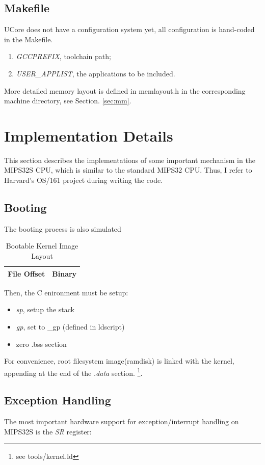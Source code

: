 \documentclass[a4paper]{article}
\begin{document}
\subsection{Makefile}
UCore does not have a configuration system yet, all configuration
is hand-coded in the Makefile.
\begin{enumerate}
\item \emph{GCCPREFIX}, toolchain path;
\item \emph{USER\_APPLIST}, the applications to be included.
\end{enumerate}

More detailed memory layout is defined in memlayout.h in the corresponding
machine directory, see Section. \ref{sec:mm}.

\section{Implementation Details}
This section describes the implementations of some important mechanism 
in the MIPS32S CPU, which is similar to the standard MIPS32 CPU.
Thus, I refer to Harvard's OS/161\cite{OS161} project during writing the code.

\subsection{Booting}
The booting process is also simulated 

\begin{table}[h]
  \centering
  \begin{tabular}{|r|r|}
    \hline
    File Offset & Binary \\
    \hline
    \hline
  \end{tabular}
  \caption{Bootable Kernel Image Layout}
  \label{tab:layout}
\end{table}

Then, the C enironment must be setup:
\begin{itemize}
\item \emph{sp}, setup the stack
\item \emph{gp}, set to \_gp (defined in ldscript)
\item zero .bss section
\end{itemize}

For convenience, root filesystem image(ramdisk) is linked
with the kernel, appending at the end of the \emph{.data} section.
\footnote{see tools/kernel.ld}.

\subsection{Exception Handling}
The most important hardware support for exception/interrupt handling on MIPS32S is the \emph{SR}
register:
\end{document}
